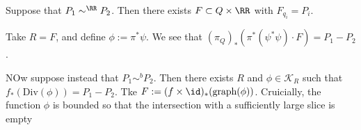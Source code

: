 

    Suppose that $P_1\sim^\RR P_2$. Then there exists $F\subset Q\times \RR$ with $F_{q_i}=P_i$. 

    Take $R=F$, and define $\phi:=\pi^*\psi$. We see that $(\pi_Q)_* (\pi^*(\psi^*\psi)\cdot F)=P_1-P_2$. 

    NOw suppose instead that $P_1\sim^b P_2$. Then there exists $R$ and $\phi\in \mathcal K_R$ such that $f_*(\mathrm{Div}(\phi))=P_1-P_2$. 
    Tke $F:=(f\times \id)_* (\text{graph}(\phi))$. Cruicially, the function $\phi$ is bounded so that the intersection with a sufficiently large slice is empty 


